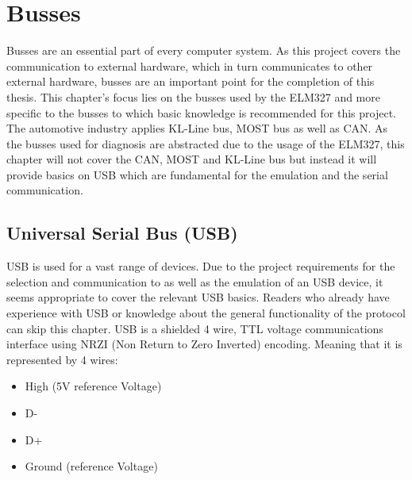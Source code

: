 \setcounter{section}{0}
\section{Busses}
Busses are an essential part of every computer system. As this project covers the communication to external hardware, which in turn communicates to other external hardware, busses are an important point for the completion of this thesis. This chapter’s focus lies on the busses used by the ELM327 and more specific to the busses to which basic knowledge is recommended for this project.  
The automotive industry applies KL-Line bus, MOST bus as well as CAN. As the busses used for diagnosis are abstracted due to the usage of the ELM327, this chapter will not cover the CAN, MOST and KL-Line bus but instead it will provide basics on USB which are fundamental for the emulation and the serial communication.


\subsection{Universal Serial Bus (USB)}
USB is used for a vast range of devices. Due to the project requirements for the selection and communication to as well as the emulation of an USB device, it seems appropriate to cover the relevant USB basics. Readers who already have experience with USB or knowledge about the general functionality of the protocol can skip this chapter.
USB is a shielded 4 wire, TTL voltage communications interface using NRZI (Non Return to Zero Inverted) encoding. Meaning that it is represented by 4 wires:
\begin{itemize}
\item High (5V reference Voltage)
\item D-
\item D+
\item Ground (reference Voltage)
\end{itemize}

